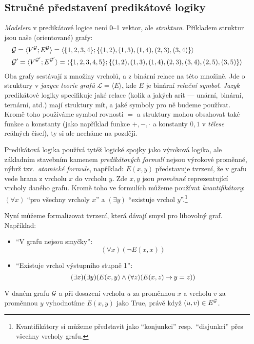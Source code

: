 \subsection{Stručné představení predikátové logiky}

\emph{Modelem} v predikátové logice není 0--1 vektor, ale \emph{struktura}. Příkladem struktur jsou naše (orientované) grafy:
\begin{align*}
    &\mathcal{G} = \langle V^{\mathcal{G}}; E^{\mathcal{G}} \rangle = \langle \{1,2,3,4\}; \{(1,2),(1,3),(1,4),(2,3),(3,4)\} \rangle \\ 
    &\mathcal{G}' = \langle V^{\mathcal{G}'}; E^{\mathcal{G}'} \rangle = \langle \{1,2,3,4,5\}; \{(1,2),(1,3),(1,4),(2,3),(3,4),(2,5),(3,5)\} \rangle
\end{align*}
Oba grafy sestávají z množiny vrcholů, a z binární relace na této množině. Jde o struktury v \emph{jazyce teorie grafů} \( \mathcal L=\langle E \rangle \), kde \(E\) je binární \emph{relační symbol}. \emph{Jazyk} predikátové logiky specifikuje jaké relace (kolik a jakých arit --- unární, binární, ternární, atd.) mají struktury mít, a jaké symboly pro ně budeme používat. Kromě toho používáme symbol rovnosti \(=\) a struktury mohou obsahovat také funkce a konstanty (jako například funkce \( +,-,\cdot \) a konstanty $0,1$ v \emph{tělese} reálných čísel), ty si ale necháme na později.

Predikátová logika používá tytéž logické spojky jako výroková logika, ale základním stavebním kamenem \emph{predikátových formulí} nejsou výrokové proměnné, nýbrž tzv.\ \emph{atomické formule}, například: \( E(x,y) \) představuje tvrzení, že v grafu vede hrana z vrcholu \(x\) do vrcholu \(y\). Zde \(x,y\) jsou \emph{proměnné} reprezentující vrcholy daného grafu. Kromě toho ve formulích můžeme používat \emph{kvantifikátory}: \( (\forall x) \) ``pro všechny vrcholy \(x\)'' a \( (\exists y) \) ``existuje vrchol \(y\)''.\footnote{Kvantifikátory si můžeme představit jako ``konjunkci'' resp.\ ``disjunkci'' přes všechny vrcholy grafu.} 

Nyní můžeme formalizovat tvrzení, která dávají smysl pro libovolný graf. Například: 
\begin{itemize}
    \item ``V grafu nejsou smyčky'': \[ (\forall x)(\neg E(x,x)) \] 
    \item ``Existuje vrchol výstupního stupně 1'': \[ (\exists x)(\exists y)(E(x,y) \land (\forall z)(E(x,z) \mathbin{\rightarrow} y=z)) \] 
\end{itemize}
V daném grafu \(\mathcal{G}\) a při dosazení vrcholu \(u\) za proměnnou \(x\) a vrcholu \(v\) za proměnnou \(y\) vyhodnotíme \( E(x,y) \) jako True, právě když \( (u,v)\in E^{\mathcal{G}} \).


